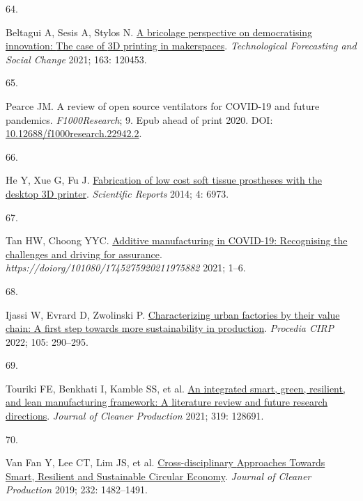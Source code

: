 \documentclass[
  12pt,
  a4paperpaper,
  onecolumn]{article}
\newlength{\cslhangindent}
\newlength{\csllabelwidth}
\newlength{\cslentryspacingunit} %
\newenvironment{CSLReferences}[2] %
 {%
  \setlength{\parindent}{0pt}
  \ifodd #1
  \let\oldpar\par
  \def\par{\hangindent=\cslhangindent\oldpar}
  \fi
  \setlength{\parskip}{#2\cslentryspacingunit}
 }%
 {}
\newcommand{\CSLLeftMargin}[1]{\parbox[t]{\csllabelwidth}{#1}}
\newcommand{\CSLRightInline}[1]{\parbox[t]{\linewidth - \csllabelwidth}{#1}\break}
\begin{document}
\begin{CSLReferences}{0}{0}
\leavevmode{}%
\CSLLeftMargin{64. }%
\CSLRightInline{Beltagui A, Sesis A, Stylos N.
\href{https://doi.org/10.1016/j.techfore.2020.120453}{A bricolage
perspective on democratising innovation: {The} case of {3D} printing in
makerspaces}. \emph{Technological Forecasting and Social Change} 2021;
163: 120453.}

\leavevmode{}%
\CSLLeftMargin{65. }%
\CSLRightInline{Pearce JM. A review of open source ventilators for
{COVID-19} and future pandemics. \emph{F1000Research}; 9. Epub ahead of
print 2020. DOI:
\href{https://doi.org/10.12688/f1000research.22942.2}{10.12688/f1000research.22942.2}.}

\leavevmode{}%
\CSLLeftMargin{66. }%
\CSLRightInline{He Y, Xue G, Fu J.
\href{https://doi.org/10.1038/srep06973}{Fabrication of low cost soft
tissue prostheses with the desktop {3D} printer}. \emph{Scientific
Reports} 2014; 4: 6973.}

\leavevmode{}%
\CSLLeftMargin{67. }%
\CSLRightInline{Tan HW, Choong YYC.
\href{https://doi.org/10.1080/17452759.2021.1975882}{Additive
manufacturing in {COVID-19}: Recognising the challenges and driving for
assurance}. \emph{https://doiorg/101080/1745275920211975882} 2021;
1--6.}

\leavevmode{}%
\CSLLeftMargin{68. }%
\CSLRightInline{Ijassi W, Evrard D, Zwolinski P.
\href{https://doi.org/10.1016/j.procir.2022.02.048}{Characterizing urban
factories by their value chain: A first step towards more sustainability
in production}. \emph{Procedia CIRP} 2022; 105: 290--295.}

\leavevmode{}%
\CSLLeftMargin{69. }%
\CSLRightInline{Touriki FE, Benkhati I, Kamble SS, et al.
\href{https://doi.org/10.1016/J.JCLEPRO.2021.128691}{An integrated
smart, green, resilient, and lean manufacturing framework: {A}
literature review and future research directions}. \emph{Journal of
Cleaner Production} 2021; 319: 128691.}

\leavevmode{}%
\CSLLeftMargin{70. }%
\CSLRightInline{Van Fan Y, Lee CT, Lim JS, et al.
\href{https://doi.org/10.1016/j.jclepro.2019.05.266}{Cross-disciplinary
{Approaches Towards Smart}, {Resilient} and {Sustainable Circular
Economy}}. \emph{Journal of Cleaner Production} 2019; 232: 1482--1491.}


\end{CSLReferences}
\end{document}
